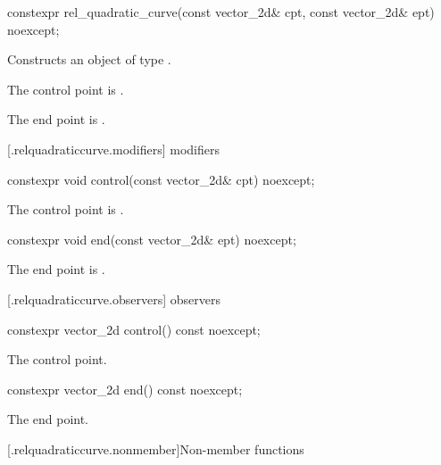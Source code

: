 %
\begin{itemdecl}
constexpr rel_quadratic_curve(const vector_2d& cpt, const vector_2d& ept)
  noexcept;
\end{itemdecl}
\begin{itemdescr}
\pnum
\effects
Constructs an object of type .

\pnum
The control point is .

\pnum
The end point is .
\end{itemdescr}

 [\iotwod.relquadraticcurve.modifiers]{ modifiers}

%
\begin{itemdecl}
constexpr void control(const vector_2d& cpt) noexcept;
\end{itemdecl}
\begin{itemdescr}
\pnum
\effects
The control point is .
\end{itemdescr}

%
\begin{itemdecl}
constexpr void end(const vector_2d& ept) noexcept;
\end{itemdecl}
\begin{itemdescr}
\pnum
\effects
The end point is .
\end{itemdescr}

 [\iotwod.relquadraticcurve.observers]{ observers}

%
\begin{itemdecl}
constexpr vector_2d control() const noexcept;
\end{itemdecl}
\begin{itemdescr}
\pnum
\returns
The control point.
\end{itemdescr}

%
\begin{itemdecl}
constexpr vector_2d end() const noexcept;
\end{itemdecl}
\begin{itemdescr}
\pnum
\returns
The end point.
\end{itemdescr}

 [\iotwod.relquadraticcurve.nonmember]{Non-member functions}

